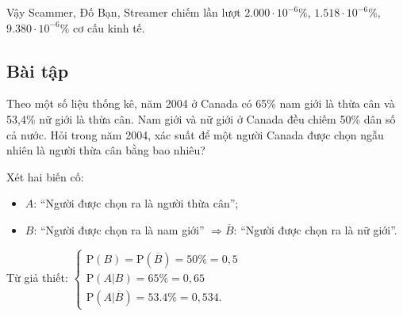 \documentclass[twoside,final]{hcmut-report}
\newcommand{\exercise}[1]{\begin{exercisebox}#1\end{exercisebox}}
\begin{document}
Vậy Scammer, Đố Bạn, Streamer chiếm lần lượt $2.000\cdot 10^{-6}\%$, $1.518\cdot 10^{-6}\%$, $9.380\cdot 10^{-6}\%$ cơ cấu kinh tế.
\subsection{Bài tập}
\exercise{Theo một số liệu thống kê, năm 2004 ở Canada có 65\% nam giới là thừa cân và 53,4\% nữ giới là thừa cân. Nam giới và nữ giới ở Canada đều chiếm 50\% dân số cả nước. Hỏi trong năm 2004, xác suất để một người Canada được chọn ngẫu nhiên là người thừa cân bằng bao nhiêu?}

Xét hai biến cố:
\begin{itemize}[itemsep=0pt, topsep=0pt, parsep=0pt,label=-]
    \item $A$: ``Người được chọn ra là người thừa cân'';
    \item $B$: ``Người được chọn ra là nam giới'' $\Rightarrow\overline{B}$: ``Người được chọn ra là nữ giới''.
\end{itemize}

Từ giả thiết:
$\begin{cases}
        \mathrm{P}(B) = \mathrm{P}(\overline{B}) = 50\% = 0{,}5 \\
        \mathrm{P}(A | B) = 65\% = 0{,}65                       \\
        \mathrm{P}(A | \overline{B}) = 53.4\% = 0{,}534.
    \end{cases}$
\end{document}
